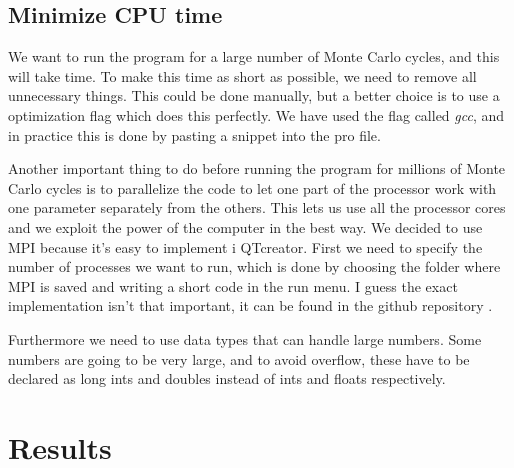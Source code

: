 \documentclass[norsk,a4paper,12pt]{article}
\begin{document}
\subsection{Minimize CPU time}
We want to run the program for a large number of Monte Carlo cycles, and this will take time. To make this time as short as possible, we need to remove all unnecessary things. This could be done manually, but a better choice is to use a optimization flag which does this perfectly. We have used the flag called \textit{gcc}, and in practice this is done by pasting a snippet into the pro file. \par\vspace{5mm}

Another important thing to do before running the program for millions of Monte Carlo cycles is to parallelize the code to let one part of the processor work with one parameter separately from the others. This lets us use all the processor cores and we exploit the power of the computer in the best way.  
We decided to use MPI because it's easy to implement i QTcreator. First we need to specify the number of processes we want to run, which is done by choosing the folder where MPI is saved and writing a short code in the run menu. I guess the exact implementation isn't that important, it can be found in the github repository \cite{Repository}.\par\vspace{5mm}

Furthermore we need to use data types that can handle large numbers. Some numbers are going to be very large, and to avoid overflow, these have to be declared as long ints and doubles instead of ints and floats respectively.

\section{Results}
\end{document}
